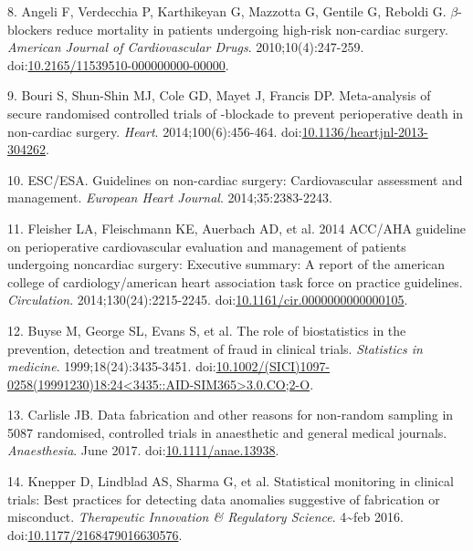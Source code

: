 \documentclass[]{article}
\begin{document}
\hypertarget{ref-Angeli2010}{}
8. Angeli F, Verdecchia P, Karthikeyan G, Mazzotta G, Gentile G, Reboldi
G. \(\beta\)-blockers reduce mortality in patients undergoing high-risk
non-cardiac surgery. \emph{American Journal of Cardiovascular Drugs}.
2010;10(4):247-259.
doi:\href{https://doi.org/10.2165/11539510-000000000-00000}{10.2165/11539510-000000000-00000}.

\hypertarget{ref-bouri2014}{}
9. Bouri S, Shun-Shin MJ, Cole GD, Mayet J, Francis DP. Meta-analysis of
secure randomised controlled trials of -blockade to prevent
perioperative death in non-cardiac surgery. \emph{Heart}.
2014;100(6):456-464.
doi:\href{https://doi.org/10.1136/heartjnl-2013-304262}{10.1136/heartjnl-2013-304262}.

\hypertarget{ref-esc2014}{}
10. ESC/ESA. Guidelines on non-cardiac surgery: Cardiovascular
assessment and management. \emph{European Heart Journal}.
2014;35:2383-2243.

\hypertarget{ref-Fleisher_2014}{}
11. Fleisher LA, Fleischmann KE, Auerbach AD, et al. 2014 ACC/AHA
guideline on perioperative cardiovascular evaluation and management of
patients undergoing noncardiac surgery: Executive summary: A report of
the american college of cardiology/american heart association task force
on practice guidelines. \emph{Circulation}. 2014;130(24):2215-2245.
doi:\href{https://doi.org/10.1161/cir.0000000000000105}{10.1161/cir.0000000000000105}.

\hypertarget{ref-Buyse1999-jq}{}
12. Buyse M, George SL, Evans S, et al. The role of biostatistics in the
prevention, detection and treatment of fraud in clinical trials.
\emph{Statistics in medicine}. 1999;18(24):3435-3451.
doi:\href{https://doi.org/10.1002/(SICI)1097-0258(19991230)18:24\%3C3435::AID-SIM365\%3E3.0.CO;2-O}{10.1002/(SICI)1097-0258(19991230)18:24\textless{}3435::AID-SIM365\textgreater{}3.0.CO;2-O}.

\hypertarget{ref-10.1111ux2fanae.13938}{}
13. Carlisle JB. Data fabrication and other reasons for non-random
sampling in 5087 randomised, controlled trials in anaesthetic and
general medical journals. \emph{Anaesthesia}. June 2017.
doi:\href{https://doi.org/10.1111/anae.13938}{10.1111/anae.13938}.

\hypertarget{ref-Knepper2016-la}{}
14. Knepper D, Lindblad AS, Sharma G, et al. Statistical monitoring in
clinical trials: Best practices for detecting data anomalies suggestive
of fabrication or misconduct. \emph{Therapeutic Innovation \& Regulatory
Science}. 4\textasciitilde{}feb 2016.
doi:\href{https://doi.org/10.1177/2168479016630576}{10.1177/2168479016630576}.
\end{document}
